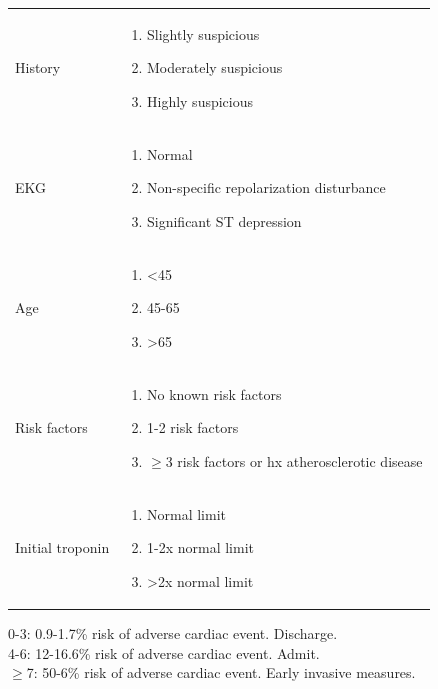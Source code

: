 \documentclass[8pt]{extarticle}
\begin{document}
\begin{tabularx}{\linewidth}{|X|X|}
\hline
History & 
    \begin{enumerate}
        \item{Slightly suspicious}
        \item{Moderately suspicious}
        \item{Highly suspicious}
    \end{enumerate}
    \\

EKG &
    \begin{enumerate}
        \item{Normal}
        \item{Non-specific repolarization disturbance}
        \item{Significant ST depression}
    \end{enumerate}
    \\
    
Age &
    \begin{enumerate}
        \item{<45}
        \item{45-65}
        \item{>65}
    \end{enumerate}
    \\
    
Risk factors &
    \begin{enumerate}
        \item{No known risk factors}
        \item{1-2 risk factors}
        \item{$\geq$3 risk factors or hx atherosclerotic disease}
    \end{enumerate}
    \\

Initial troponin &
    \begin{enumerate}
        \item{Normal limit}
        \item{1-2x normal limit}
        \item{>2x normal limit}
    \end{enumerate}
    \\
\hline
\end{tabularx}

0-3: 0.9-1.7\% risk of adverse cardiac event. Discharge.\\
4-6: 12-16.6\% risk of adverse cardiac event. Admit.\\
$\geq$7: 50-6\% risk of adverse cardiac event. Early invasive measures.\\
\end{document}
